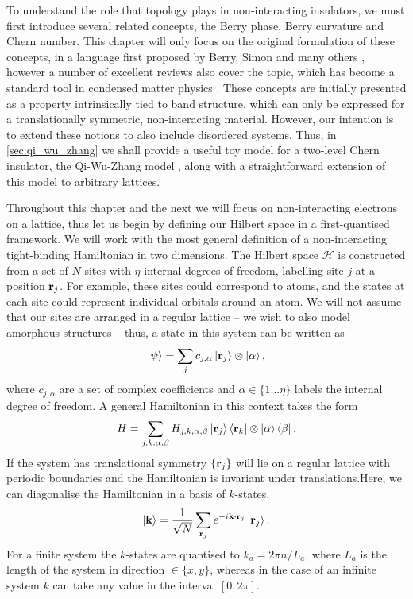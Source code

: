To understand the role that topology plays in non-interacting insulators, we must first introduce several related concepts, the Berry phase, Berry curvature and Chern number. This chapter will only focus on the original formulation of these concepts, in a language first proposed by Berry, Simon and many others \cite{berry_quantal_1984,avron_homotopy_1983,simon_holonomy_1983}, however a number of excellent reviews also cover the topic, which has become a standard tool in condensed matter physics \cite{xiao_berry_2010,vanderbilt_berry_2018,asboth_short_2016,resta_geometry_2020}. These concepts are initially presented as a property intrinsically tied to band structure, which can only be expressed for a translationally symmetric, non-interacting material. However, our intention is to extend these notions to also include disordered systems. Thus, in \textsection\ref{sec:qi_wu_zhang} we shall provide a useful toy model for a two-level Chern insulator, the Qi-Wu-Zhang model \cite{qi_topological_2006}, along with a straightforward extension of this model to arbitrary lattices. 

Throughout this chapter and the next we will focus on non-interacting electrons on a lattice, thus let us begin by defining our Hilbert space in a first-quantised framework. We will work with the most general definition of a non-interacting tight-binding Hamiltonian in two dimensions. The Hilbert space $\mathcal H$ is constructed from a set of $N$ sites with $\eta$ internal degrees of freedom, labelling site $j$ at a position $\textbf r_j$. For example, these sites could correspond to atoms, and the states at each site could represent individual orbitals around an atom. We will not assume that our sites are arranged in a regular lattice -- we wish to also model amorphous structures -- thus, a state in this system can be written as
\begin{align}
    \ket {\psi} = \sum_j c_{j, \alpha} \ket{\textbf r_j} \otimes \ket{\alpha},
\end{align}
where $c_{j, \alpha}$ are a set of complex coefficients and $\alpha \in \{1 ... \eta\}$ labels the internal degree of freedom. A general Hamiltonian in this context takes the form
\begin{align} \label{eqn:ham_form}
    H = \sum_{\substack{j,k, \alpha, \beta}} H_{j,k,\alpha,\beta} \ket{\textbf r_j}\bra{\textbf r_k} \otimes \ket{\alpha}\bra{\beta}.
\end{align}
If the system has translational symmetry $\{\textbf r_j\}$  will lie on a regular lattice with periodic boundaries and the Hamiltonian is invariant under translations.Here, we can diagonalise the Hamiltonian in a basis of $k$-states,
\begin{align}\label{eqn:k_state_def}
    \ket {\textbf k} = \frac 1 {\sqrt N} \sum_{\textbf r_j} e^{-i \textbf k \cdot \textbf r_j} \ket {\textbf r_j}. 
\end{align}
For a finite system the $k$-states are quantised to $k_a = 2\pi n / L_a$, where $L_a$ is the length of the system in direction $ \in \{x,y\}$, whereas in the case of an infinite system $k$ can take any value in the interval $[0,2\pi]$.
